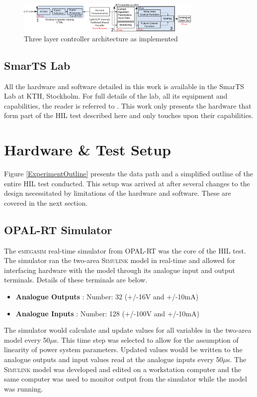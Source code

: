 \documentclass[conference]{IEEEtran}
\begin{document}
\begin{figure}[]
\centering
\includegraphics[width=3.5in]{ArchitectureDevelopment.pdf} 
\caption{Three layer controller architecture as implemented}
\label{FinalArch}
\end{figure}

\subsection{SmarTS Lab}
All the hardware and software detailed in this work is available in the SmarTS Lab at KTH, Stockholm. For full details of the lab, all its equipment and capabilities, the reader is referred to \cite{SmarTSLab}. This work only presents the hardware that form part of the HIL test described here and only touches upon their capabilities.

\section{Hardware \& Test Setup}\label{hardware}

Figure \ref{ExperimentOutline} presents the data path and a simplified outline of the entire HIL test conducted. This setup was arrived at after several changes to the design necessitated by limitations of the hardware and software. These are covered in the next section.

\subsection{OPAL-RT Simulator}
The e\textsc{megasim}\cite{eMEGASIM} real-time simulator from OPAL-RT\cite{OPALemegasim} was the core of the HIL test. The simulator ran the two-area \textsc{Simulink} model in real-time and allowed for interfacing hardware with the model through its analogue input and output terminals.  Details of these terminals are below.

\begin{itemize}
\item \textbf{Analogue Outputs} : Number: 32 (+/-16V and +/-10mA)
\item \textbf{Analogue Inputs} : Number: 128 (+/-100V and +/-10mA)
\end{itemize}

The simulator would calculate and update values for all variables in the two-area model every 50$\mu$s. This time step was selected to allow for the assumption of linearity of power system parameters. Updated values would be written to the analogue outputs and input values read at the analogue inputs every 50$\mu$s. The \textsc{Simulink} model was developed and edited on a workstation computer and the same computer was used to monitor output from the simulator while the model was running.
\end{document}
